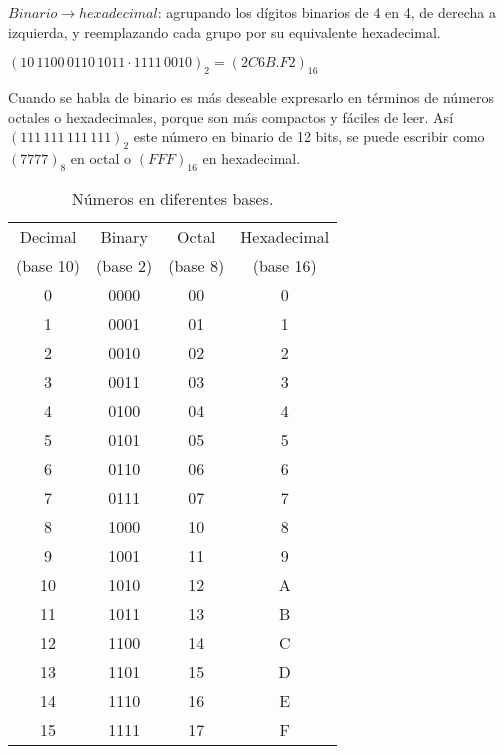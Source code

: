 $Binario \rightarrow hexadecimal$: agrupando los d\'{i}gitos binarios de 4 en 4,
de derecha a izquierda, y reemplazando cada grupo por su equivalente
hexadecimal.
\begin{center}
    \large
    $(10\,1100\,0110\,1011 \cdot 1111\,0010)_2 = (2C6B.F2)_{16}$
\end{center}

Cuando se habla de binario es m\'{a}s deseable expresarlo en t\'{e}rminos de
n\'{u}meros octales o hexadecimales, porque son m\'{a}s compactos y f\'{a}ciles
de leer. As\'{i} $(111\,111\,111\,111)_2$ este n\'{u}mero en binario de 12 bits,
se puede escribir como $(7777)_8$ en octal o $(FFF)_{16}$ en hexadecimal.
\medskip

\begin{table}[h]
    \centering
    \begin{tabular}{cccc}
        \toprule Decimal & Binary   & Octal    & Hexadecimal \\
        (base 10)        & (base 2) & (base 8) & (base 16)   \\
        \midrule 0       & 0000     & 00       & 0           \\
        1                & 0001     & 01       & 1           \\
        2                & 0010     & 02       & 2           \\
        3                & 0011     & 03       & 3           \\
        4                & 0100     & 04       & 4           \\
        5                & 0101     & 05       & 5           \\
        6                & 0110     & 06       & 6           \\
        7                & 0111     & 07       & 7           \\
        8                & 1000     & 10       & 8           \\
        9                & 1001     & 11       & 9           \\
        10               & 1010     & 12       & A           \\
        11               & 1011     & 13       & B           \\
        12               & 1100     & 14       & C           \\
        13               & 1101     & 15       & D           \\
        14               & 1110     & 16       & E           \\
        15               & 1111     & 17       & F           \\
        \bottomrule
    \end{tabular}
    \caption{N\'{u}meros en diferentes bases.}
    \label{tab:numbers}
\end{table}

